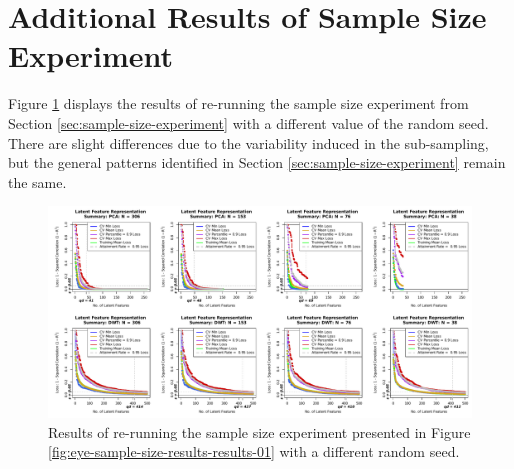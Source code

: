 \section{Additional Results of Sample Size Experiment}\label{sec:additional-results}

Figure \ref{fig:eye-sample-size-results-results-02} displays the results of re-running the sample size experiment from Section \ref{sec:sample-size-experiment} with a different value of the random seed.
There are slight differences due to the variability induced in the sub-sampling, but the general patterns identified in Section \ref{sec:sample-size-experiment} remain the same.

\begin{figure}
    \centering
    \includegraphics[width=1\linewidth]{figures/eye-sample-size-results-results-02.pdf}
    \caption{Results of re-running the sample size experiment presented in Figure \ref{fig:eye-sample-size-results-results-01} with a different random seed.}
    \label{fig:eye-sample-size-results-results-02}
\end{figure}